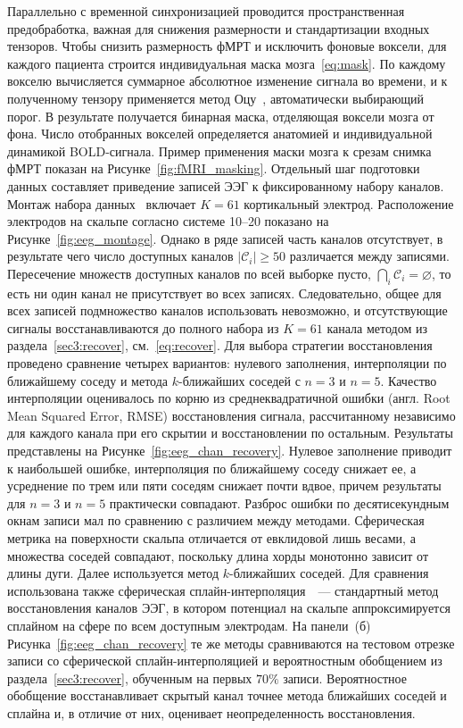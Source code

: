 Параллельно с временной синхронизацией проводится пространственная предобработка, важная для снижения размерности и стандартизации входных тензоров. Чтобы снизить размерность фМРТ и исключить фоновые воксели, для каждого пациента строится индивидуальная маска мозга~\eqref{eq:mask}. По каждому вокселю вычисляется суммарное абсолютное изменение сигнала во времени, и к полученному тензору применяется метод Оцу~\cite{otsu1975threshold}, автоматически выбирающий порог. В результате получается бинарная маска, отделяющая воксели мозга от фона. Число отобранных вокселей определяется анатомией и индивидуальной динамикой BOLD-сигнала. Пример применения маски мозга к срезам снимка фМРТ показан на Рисунке~\ref{fig:fMRI_masking}.
Отдельный шаг подготовки данных составляет приведение записей ЭЭГ к фиксированному набору каналов. Монтаж набора данных~\cite{Telesford2023} включает $K = 61$ кортикальный электрод. Расположение электродов на скальпе согласно системе 10--20 показано на Рисунке~\ref{fig:eeg_montage}. Однако в ряде записей часть каналов отсутствует, в результате чего число доступных каналов $|\mathcal{C}_i| \ge 50$ различается между записями. Пересечение множеств доступных каналов по всей выборке пусто, $\bigcap_i \mathcal{C}_i = \varnothing$, то есть ни один канал не присутствует во всех записях. Следовательно, общее для всех записей подмножество каналов использовать невозможно, и отсутствующие сигналы восстанавливаются до полного набора из $K = 61$ канала методом из раздела~\ref{sec3:recover}, см.~\eqref{eq:recover}.
Для выбора стратегии восстановления проведено сравнение четырех вариантов: нулевого заполнения, интерполяции по ближайшему соседу и метода $k$-ближайших соседей с $n = 3$ и $n = 5$. Качество интерполяции оценивалось по корню из среднеквадратичной ошибки (англ. Root Mean Squared Error, RMSE) восстановления сигнала, рассчитанному независимо для каждого канала при его скрытии и восстановлении по остальным. Результаты представлены на Рисунке~\ref{fig:eeg_chan_recovery}. Нулевое заполнение приводит к наибольшей ошибке, интерполяция по ближайшему соседу снижает ее, а усреднение по трем или пяти соседям снижает почти вдвое, причем результаты для $n = 3$ и $n = 5$ практически совпадают. Разброс ошибки по десятисекундным окнам записи мал по сравнению с различием между методами. Сферическая метрика на поверхности скальпа отличается от евклидовой лишь весами, а множества соседей совпадают, поскольку длина хорды монотонно зависит от длины дуги. Далее используется метод $k$-ближайших соседей. Для сравнения использована также сферическая сплайн-интерполяция~\cite{perrin1989spherical}~--- стандартный метод восстановления каналов ЭЭГ, в котором потенциал на скальпе аппроксимируется сплайном на сфере по всем доступным электродам. На панели~(б) Рисунка~\ref{fig:eeg_chan_recovery} те же методы сравниваются на тестовом отрезке записи со сферической сплайн-интерполяцией и вероятностным обобщением из раздела~\ref{sec3:recover}, обученным на первых $70\%$ записи. Вероятностное обобщение восстанавливает скрытый канал точнее метода ближайших соседей и сплайна и, в отличие от них, оценивает неопределенность восстановления.

